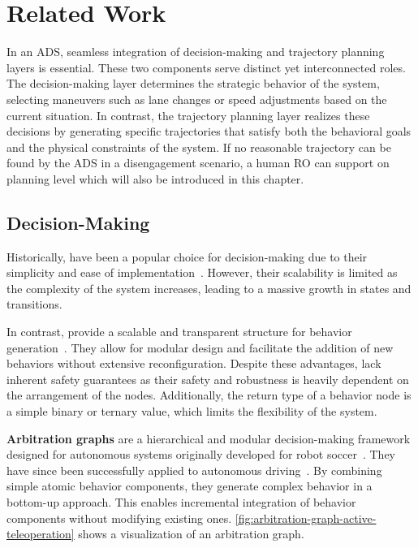 \section{Related Work}
\label{sec:related_work}

In an \gls{ADS}, seamless integration of decision-making and trajectory planning layers is essential.
These two components serve distinct yet interconnected roles.
The decision-making layer determines the strategic behavior of the system, selecting maneuvers such as lane changes or speed adjustments based on the current situation.
In contrast, the trajectory planning layer realizes these decisions by generating specific trajectories that satisfy both the behavioral goals and the physical constraints of the system.
If no reasonable trajectory can be found by the \gls{ADS} in a disengagement scenario, a human \gls{RO} can support on planning level which will also be introduced in this chapter.
%

\subsection{Decision-Making}
\label{sec:decision_making}

Historically, \textbf{} have been a popular choice for decision-making due to their simplicity and ease of implementation~\cite{wagnerModelingSoftwareFinite2006,hopcroftIntroductionAutomataTheory2007}.
However, their scalability is limited as the complexity of the system increases, leading to a massive growth in states and transitions.

In contrast, \textbf{} provide a scalable and transparent structure for behavior generation~\cite{colledanchiseBehaviorTreesRobotics2018}.
They allow for modular design and facilitate the addition of new behaviors without extensive reconfiguration.
Despite these advantages,  lack inherent safety guarantees as their safety and robustness is heavily dependent on the arrangement of the nodes.
Additionally, the return type of a behavior node is a simple binary or ternary value, which limits the flexibility of the system.

\textbf{Arbitration graphs} are a hierarchical and modular decision-making framework designed for autonomous systems originally developed for robot soccer~\cite{lauerCognitiveConceptsAutonomous2010}.
They have since been successfully applied to autonomous driving~\cite{orzechowskiDecisionMakingAutomatedVehicles2020, orzechowskiVerhaltensentscheidungFuerAutomatisierte2023}.
By combining simple atomic behavior components, they generate complex behavior in a bottom-up approach.
This enables incremental integration of behavior components without modifying existing ones.
\cref{fig:arbitration-graph-active-teleoperation} shows a visualization of an arbitration graph.

